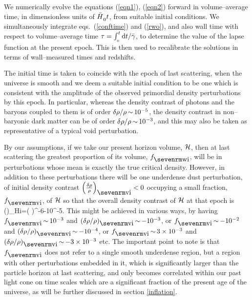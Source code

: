 \documentclass[12pt]{article}
\begin{document}
We numerically evolve the equations (\ref{eqn1}), (\ref{eqn2})
forward in volume--average time, in dimensionless units of $\Hb\ts$,
from suitable initial conditions. We simultaneously integrate eqs.\
(\ref{conftime}) and (\ref{rwo}), and also wall time with respect to
volume--average time $\tc=\int^t\X0\dd\ts/\gb$, to determine the
value of the lapse function at the present epoch. This is then used to
recalibrate the solutions in terms of wall--measured times and redshifts.

The initial time is taken to coincide with the epoch of last scattering,
when the universe is smooth and we deem a suitable initial condition to be one
which is consistent with the amplitude of the observed primordial density
perturbations by this epoch. In particular, whereas the density contrast of
photons and the baryons coupled to them is of order $\delta\rho/\rho\mathop{\sim}\limits10^{-5}
$, the density contrast in non--baryonic dark matter can be of order
$\delta\rho/\rho\mathop{\sim}\limits10^{-3}$, and this may also be taken as representative
of a typical void perturbation.

By our assumptions, if we take our present horizon volume, $\cal H$,
then at last scattering the greatest proportion of its volume, $\fwi$,
will be in perturbations whose mean is exactly the true
critical density. However, in addition to these perturbations there will
be one underdense dust perturbation, of initial density contrast
$\left(\de\rh\over\rh\right)\ns{vi}<0$ occupying a small fraction, $\fvi$,
of $\cal H$ so that the overall density contrast of $\cal H$ at that epoch is
\beq
\left(\de\rh\over\rh\right)_{\!\cal H\hbox{\sevenrm i}}=\fvi\left(\de\rh\over
\rh\right)\ns{vi}\goesas-10^{-6}\w{to}-10^{-5}.\label{initc}\eeq
This might be achieved in various ways, by having $\fvi\goesas10^{-3}$
and $(\de\rh/\rh)\ns{vi}\goesas-10^{-3}$, or $\fvi\goesas-10^{-2}$ and
$(\de\rh/\rh)\ns{vi}\goesas-10^{-4}$, or $\fvi\goesas3\times 10^{-3}$
and $(\de\rh/\rh)\ns{vi}\goesas-3\times 10^{-3}$ etc. The important
point to note is that $\fvi$ does not refer to a single smooth
underdense region, but a region with other perturbations embedded in it,
which is significantly larger than the particle horizon at last scattering,
and only becomes correlated within our past light cone on time scales which
are a significant fraction of the present age of the universe, as will be
further discussed in section \ref{inflation}.
\end{document}
